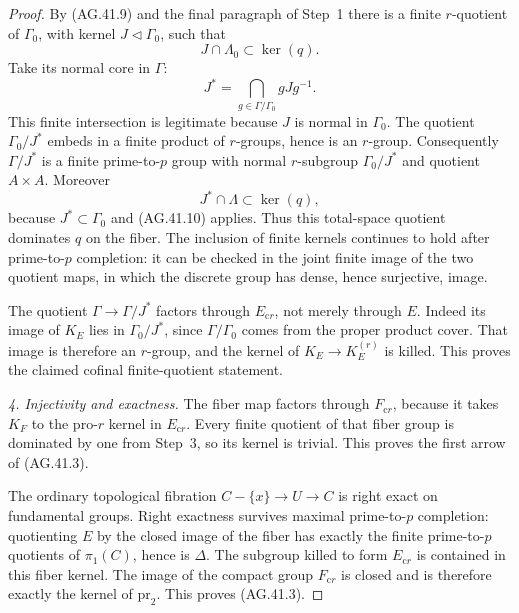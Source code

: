 \begin{proof}
By (AG.41.9) and the final paragraph of Step~1 there is
a finite \(r\)-quotient of \(\Gamma_0\), with kernel
\(J\triangleleft\Gamma_0\), such that
\[
                         J\cap\Lambda_0\subset\ker(q).
                                                        \tag{AG.41.10}
\]
Take its normal core in \(\Gamma\):
\[
                  J^*=\bigcap_{g\in\Gamma/\Gamma_0}gJg^{-1}.
                                                        \tag{AG.41.11}
\]
This finite intersection is legitimate because \(J\) is
normal in \(\Gamma_0\). The quotient
\(\Gamma_0/J^*\) embeds in a finite product of
\(r\)-groups, hence is an \(r\)-group. Consequently
\(\Gamma/J^*\) is a finite prime-to-\(p\) group with
normal \(r\)-subgroup \(\Gamma_0/J^*\) and quotient
\(A\times A\). Moreover
\[
                 J^*\cap\Lambda\subset\ker(q),
                                                        \tag{AG.41.12}
\]
because \(J^*\subset\Gamma_0\) and (AG.41.10) applies.
Thus this total-space quotient dominates \(q\) on the
fiber. The inclusion of finite kernels continues to hold
after prime-to-\(p\) completion: it can be checked in
the joint finite image of the two quotient maps, in which
the discrete group has dense, hence surjective, image.

The quotient \(\Gamma\to\Gamma/J^*\) factors through
\(E_{\mathrm{c}r}\), not merely through \(E\).
Indeed its image of \(K_E\) lies in
\(\Gamma_0/J^*\), since \(\Gamma/\Gamma_0\) comes
from the proper product cover. That image is therefore an
\(r\)-group, and the kernel of \(K_E\to K_E^{(r)}\)
is killed. This proves the claimed cofinal finite-quotient
statement.

\emph{4. Injectivity and exactness.}
The fiber map factors through \(F_{\mathrm{c}r}\),
because it takes \(K_F\) to the pro-\(r\) kernel in
\(E_{\mathrm{c}r}\). Every finite quotient of that fiber
group is dominated by one from Step~3, so its kernel is
trivial. This proves the first arrow of (AG.41.3).

The ordinary topological fibration
\(C-\{x\}\to U\to C\) is right exact on fundamental
groups. Right exactness survives maximal prime-to-\(p\)
completion: quotienting \(E\) by the closed image of
the fiber has exactly the finite prime-to-\(p\) quotients
of \(\pi_1(C)\), hence is \(\Delta\). The subgroup
killed to form \(E_{\mathrm{c}r}\) is contained in
this fiber kernel. The image of the compact group
\(F_{\mathrm{c}r}\) is closed and is therefore exactly
the kernel of \(\mathrm{pr}_2\). This proves (AG.41.3).


\end{proof}
